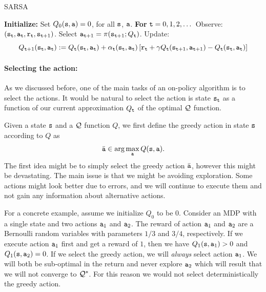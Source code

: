 \begin{algorithm}[H]
\caption{SARSA}
\begin{algorithmic}[1]
\State \textbf{Initialize:} Set $Q_0({\tt s},{\tt a}) = 0$, for all ${\tt s}$, ${\tt a}$.
\State \textbf{For} {${\tt t} = 0, 1, 2, \dots$}
    \State \quad Observe: $({\tt s}_{\tt t}, {\tt a}_{\tt t}, {\tt r}_{\tt t}, {\tt s}_{{\tt t}+1})$.
    \State \quad Select ${\tt a}_{{\tt t}+1} = \pi({\tt s}_{{\tt t}+1}; Q_{\tt t})$.
    \State \quad Update:
    \[
    Q_{{\tt t}+1}({\tt s}_{\tt t}, {\tt a}_{\tt t}) := Q_{\tt t}({\tt s}_{\tt t}, {\tt a}_{\tt t}) + \alpha_{\tt t}({\tt s}_{\tt t}, {\tt a}_{\tt t}) \left[{\tt r}_{\tt t} + \gamma Q_{\tt t}({\tt s}_{{\tt t}+1}, {\tt a}_{{\tt t}+1}) - Q_{\tt t}({\tt s}_{\tt t}, {\tt a}_{\tt t})\right]
    \]
\end{algorithmic}
\end{algorithm}

\paragraph{Selecting the action:}
As we discussed before, one of the main tasks of an on-policy
algorithm is to select the actions. It would be natural to select
the action is state ${\tt s}_{\tt t}$ as a function of our current
approximation $Q_{\tt t}$ of the optimal $\mathcal{Q}$ function.

Given a state ${\tt s}$ and a $\mathcal{Q}$ function $Q$, we first define the
greedy action in state ${\tt s}$ according to $Q$ as
\[
\bar{{\tt a}}\in\arg\max_{\tt a} Q({\tt s},{\tt a}).
\]
The first idea might be to simply select the greedy action
$\bar{{\tt a}}$, however this might be devastating. The main issue
is that we might be avoiding exploration. Some actions might look better
due to errors, and we will continue to execute them and not gain any
information about alternative actions.


For a concrete example, assume we initialize $Q_0$ to be $0$.
Consider an MDP with a single state and two actions ${\tt a}_1$ and
${\tt a}_2$. The reward of action ${\tt a}_1$ and ${\tt a}_2$ are a
Bernoulli random variables with parameters $1/3$ and $3/4$,
respectively. If we execute action ${\tt a}_1$ first and get a
reward of $1$, then we have $Q_1({\tt s},{\tt a}_1)>0$ and
$Q_1({\tt s},{\tt a}_2)=0$. If we select the greedy action, we will
\emph{always} select action ${\tt a}_1$. We will both be sub-optimal
in the return and never explore ${\tt a}_2$ which will result that
we will not converge to $\mathcal{Q}^*$. For this reason we would not select
deterministically the greedy action.


